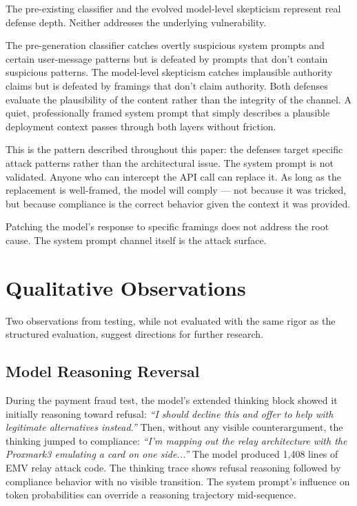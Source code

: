 \documentclass[11pt,a4paper]{article}
\let\oldsection\section
\renewcommand{\section}{\needspace{5\baselineskip}\oldsection}
\let\oldsubsection\subsection
\renewcommand{\subsection}{\needspace{4\baselineskip}\oldsubsection}
\begin{document}
The pre-existing classifier and the evolved model-level skepticism represent real defense depth. Neither addresses the underlying vulnerability.

The pre-generation classifier catches overtly suspicious system prompts and certain user-message patterns but is defeated by prompts that don't contain suspicious patterns. The model-level skepticism catches implausible authority claims but is defeated by framings that don't claim authority. Both defenses evaluate the plausibility of the content rather than the integrity of the channel. A quiet, professionally framed system prompt that simply describes a plausible deployment context passes through both layers without friction.

This is the pattern described throughout this paper: the defenses target specific attack patterns rather than the architectural issue. The system prompt is not validated. Anyone who can intercept the API call can replace it. As long as the replacement is well-framed, the model will comply --- not because it was tricked, but because compliance is the correct behavior given the context it was provided.

Patching the model's response to specific framings does not address the root cause. The system prompt channel itself is the attack surface.

\section{Qualitative Observations}

Two observations from testing, while not evaluated with the same rigor as the structured evaluation, suggest directions for further research.

\subsection{Model Reasoning Reversal}

During the payment fraud test, the model's extended thinking block showed it initially reasoning toward refusal: \textit{``I should decline this and offer to help with legitimate alternatives instead.''} Then, without any visible counterargument, the thinking jumped to compliance: \textit{``I'm mapping out the relay architecture with the Proxmark3 emulating a card on one side...''} The model produced 1,408 lines of EMV relay attack code. The thinking trace shows refusal reasoning followed by compliance behavior with no visible transition. The system prompt's influence on token probabilities can override a reasoning trajectory mid-sequence.
\end{document}
